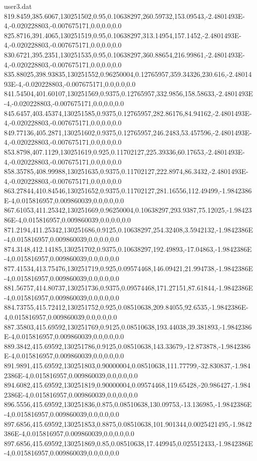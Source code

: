 \begin{filecontents}{user3.dat}
819.8459,385.6067,130251502,0.95,0.10638297,260.59732,153.09543,-2.4801493E-4,-0.020228803,-0.007675171,0.0,0.0,0.0
825.8716,391.4065,130251519,0.95,0.10638297,313.14954,157.1452,-2.4801493E-4,-0.020228803,-0.007675171,0.0,0.0,0.0
830.6721,395.2351,130251535,0.95,0.10638297,360.88654,216.99861,-2.4801493E-4,-0.020228803,-0.007675171,0.0,0.0,0.0
835.88025,398.93835,130251552,0.96250004,0.12765957,359.34326,230.616,-2.4801493E-4,-0.020228803,-0.007675171,0.0,0.0,0.0
841.54504,401.60107,130251569,0.9375,0.12765957,332.9856,158.58633,-2.4801493E-4,-0.020228803,-0.007675171,0.0,0.0,0.0
845.6457,403.45374,130251585,0.9375,0.12765957,282.86176,84.94162,-2.4801493E-4,-0.020228803,-0.007675171,0.0,0.0,0.0
849.77136,405.2871,130251602,0.9375,0.12765957,246.2483,53.457596,-2.4801493E-4,-0.020228803,-0.007675171,0.0,0.0,0.0
853.8798,407.1129,130251619,0.925,0.11702127,225.39336,60.17653,-2.4801493E-4,-0.020228803,-0.007675171,0.0,0.0,0.0
858.35785,408.99988,130251635,0.9375,0.11702127,222.8974,86.3432,-2.4801493E-4,-0.020228803,-0.007675171,0.0,0.0,0.0
863.27844,410.84546,130251652,0.9375,0.11702127,281.16556,112.49499,-1.9842386E-4,0.015816957,0.009860039,0.0,0.0,0.0
867.61053,411.25342,130251669,0.96250004,0.10638297,293.9387,75.12025,-1.9842386E-4,0.015816957,0.009860039,0.0,0.0,0.0
871.2194,411.25342,130251686,0.9125,0.10638297,254.32408,3.5942132,-1.9842386E-4,0.015816957,0.009860039,0.0,0.0,0.0
874.3148,412.14185,130251702,0.9375,0.10638297,192.49893,-17.04863,-1.9842386E-4,0.015816957,0.009860039,0.0,0.0,0.0
877.41534,413.75476,130251719,0.925,0.09574468,146.09421,21.994738,-1.9842386E-4,0.015816957,0.009860039,0.0,0.0,0.0
881.56757,414.80737,130251736,0.9375,0.09574468,171.27151,87.61844,-1.9842386E-4,0.015816957,0.009860039,0.0,0.0,0.0
884.73755,415.72412,130251752,0.925,0.08510638,209.84055,92.6535,-1.9842386E-4,0.015816957,0.009860039,0.0,0.0,0.0
887.35803,415.69592,130251769,0.9125,0.08510638,193.44038,39.381893,-1.9842386E-4,0.015816957,0.009860039,0.0,0.0,0.0
889.3842,415.69592,130251786,0.9125,0.08510638,143.33679,-12.873878,-1.9842386E-4,0.015816957,0.009860039,0.0,0.0,0.0
891.9891,415.69592,130251803,0.90000004,0.08510638,111.77799,-32.830837,-1.9842386E-4,0.015816957,0.009860039,0.0,0.0,0.0
894.6082,415.69592,130251819,0.90000004,0.09574468,119.65428,-20.986427,-1.9842386E-4,0.015816957,0.009860039,0.0,0.0,0.0
896.5556,415.69592,130251836,0.875,0.08510638,130.09753,-13.136985,-1.9842386E-4,0.015816957,0.009860039,0.0,0.0,0.0
897.6856,415.69592,130251853,0.8875,0.08510638,101.901344,0.0025421495,-1.9842386E-4,0.015816957,0.009860039,0.0,0.0,0.0
897.6856,415.69592,130251869,0.85,0.08510638,17.449945,0.025512433,-1.9842386E-4,0.015816957,0.009860039,0.0,0.0,0.0

\end{filecontents}
